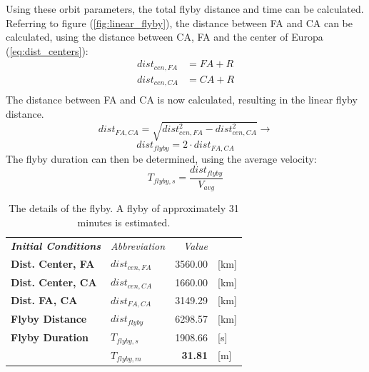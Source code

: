 Using these orbit parameters, the total flyby distance and time can be calculated. Referring to figure (\ref{fig:linear_flyby}), the distance between FA and CA can be calculated, using the distance between CA, FA and the center of Europa (\ref{eq:dist_centers}):
\begin{equation}\label{eq:dist_centers}
\begin{split}
dist_{cen,FA} &= FA+R\\
dist_{cen,CA} &= CA+R\\
\end{split}
\end{equation}
The distance between FA and CA is now calculated, resulting in the linear flyby distance.
\begin{equation}\label{eq:dist_fa_ca}
dist_{FA, CA} = \sqrt{dist_{cen,FA}^2-dist_{cen,CA}^2} \rightarrow
\end{equation}
\begin{equation}\label{eq:dist_flyby_dist}
dist_{flyby} = 2\cdot dist_{FA, CA}
\end{equation}
The flyby duration can then be determined, using the average velocity:
\begin{equation}
T_{flyby,s} = \frac{dist_{flyby}}{V_{avg}}
\end{equation}
\begin{table}[htb!]
  \centering
    \begin{tabular}{l|l|r|l}
\textit{\textbf{Initial Conditions}} & \textit{Abbreviation} & \multicolumn{1}{r}{\textit{Value}} &  \bigstrut[b]\\
\cline{1-3}\textbf{Dist. Center, FA} & $dist_{cen,FA}$ & 3560.00 & [km] \bigstrut[t]\\
\textbf{Dist. Center, CA} & $dist_{cen,CA}$ & 1660.00 & [km] \bigstrut[b]\\
\cline{1-3}\textbf{Dist. FA, CA} & $dist_{FA, CA}$ & 3149.29 & [km] \bigstrut[t]\\
\textbf{Flyby Distance} & $dist_{flyby}$ & 6298.57 & [km] \bigstrut[b]\\
\cline{1-3}\textbf{Flyby Duration} & $T_{flyby,s}$ & 1908.66 & [s] \bigstrut[t]\\
      & $T_{flyby,m}$ & \textbf{31.81} & [m] \\
\end{tabular}%
  \caption{The details of the flyby. A flyby of approximately 31 minutes is estimated.}
  \label{tab:flyby_init_cond}%
\end{table}%

